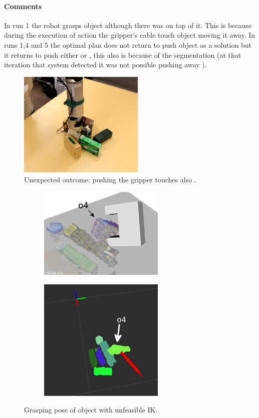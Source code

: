 \paragraph{Comments}
In run 1 the robot grasps object  although there was  on top of it. This is because during the execution of   action the gripper's cable touch object  moving it away.  In runs 1,4 and 5 the optimal plan does not return to push object  as a solution but it returns to push either  or , this also is because of the segmentation (at that iteration that system detected it was not possible pushing away ). 


\begin{figure}[tb]
\centering
\includegraphics[width=6cm]{Img/experiments/exp_good/pushing_o0c.png}
\caption{Unexpected outcome: pushing  the gripper touches also .}\label{fig:pushing_o0}
\end{figure}

\begin{figure}[tb]
\centering
\begin{subfigure}[t]{0.45\textwidth}
\centering
\includegraphics[width=6cm]{Img/experiments/exp_good/grasp_o4.png}
\end{subfigure}
\begin{subfigure}[t]{0.45\textwidth}
\centering
\includegraphics[width=6cm]{Img/experiments/exp_good/grasp_o4_rviz.png}
\end{subfigure}
\caption{Grasping pose of object  with unfeasible IK.}\label{fig:grasp_o4}
\end{figure}

